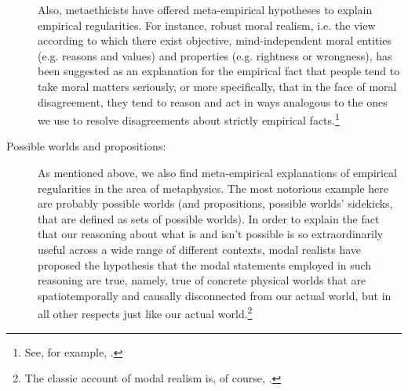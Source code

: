 \documentclass[a4paper,12pt]{article}
\begin{document}
\begin{description}
Also, metaethicists have offered meta-empirical hypotheses to explain empirical regularities. For instance, robust moral realism, i.e. the view according to which there exist objective, mind-independent moral entities (e.g. reasons and values) and properties (e.g. rightness or wrongness), has been suggested as an explanation for the empirical fact that people tend to take moral matters seriously, or more specifically, that in the face of moral disagreement, they tend to reason and act in ways analogous to the ones we use to resolve disagreements about strictly empirical facts.\footnote{See, for example, \cite[p.~23f]{Enoch2011_Taking}.}

\item[Possible worlds and propositions:] As mentioned above, we also find meta-empirical explanations of empirical regularities in the area of metaphysics. The most notorious example here are probably possible worlds (and propositions, possible worlds' sidekicks, that are defined as sets of possible worlds). In order to explain the fact that our reasoning about what is and isn't possible is so extraordinarily useful across a wide range of different contexts, modal realists have proposed the hypothesis that the modal statements employed in such reasoning are true, namely, true of concrete physical worlds that are spatiotemporally and causally disconnected from our actual world, but in all other respects just like our actual world.\footnote{The classic account of modal realism is, of course, \cite{Lewis1986}.}


\end{description}
\end{document}
